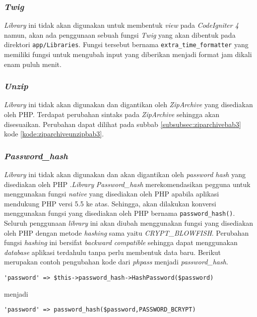\subsubsection{\textit{Twig}}
\textit{Library} ini tidak akan digunakan untuk membentuk \textit{view} pada \textit{CodeIgniter 4} namun, akan ada penggunaan sebuah fungsi \textit{Twig} yang akan dibentuk pada direktori \texttt{app/Libraries}. Fungsi tersebut bernama \texttt{extra\_time\_formatter} yang memiliki fungsi untuk mengubah input yang diberikan menjadi format jam dikali enam puluh menit. 

\subsubsection{\textit{Unzip}}
\textit{Library} ini tidak akan digunakan dan digantikan oleh \textit{ZipArchive} yang disediakan oleh PHP. Terdapat perubahan sintaks pada \textit{ZipArchive} sehingga akan disesuaikan. Perubahan dapat dilihat pada subbab \ref{subsubsec:ziparchivebab3} kode \ref{kode:ziparchiveunzipbab3}.

\subsubsection{\textit{Password\_hash}}
\textit{Library} ini tidak akan digunakan dan akan digantikan oleh \textit{password hash} yang disediakan oleh PHP .\textit{Library} \textit{Password\_hash} merekomendasikan pegguna untuk menggunakan fungsi \textit{native} yang disediakan oleh PHP apabila aplikasi mendukung PHP versi 5.5 ke atas. Sehingga, akan dilakukan konversi menggunakan fungsi yang disediakan oleh PHP bernama \texttt{password\_hash()}. Seluruh penggunaan \textit{library} ini akan diubah menggunakan fungsi yang disediakan oleh PHP dengan metode \textit{hashing} sama yaitu \textit{CRYPT\_BLOWFISH}. Perubahan fungsi \textit{hashing} ini bersifat \textit{backward compatible} sehingga dapat menggunakan \textit{database} aplikasi terdahulu tanpa perlu membentuk data baru. Berikut merupakan contoh pengubahan kode dari \textit{phpass} menjadi \textit{password\_hash}.

\begin{center}
\verb|'password' => $this->password_hash->HashPassword($password)|
\end{center}
menjadi
\begin{center}
\verb|'password' => password_hash($password,PASSWORD_BCRYPT)|
\end{center}

